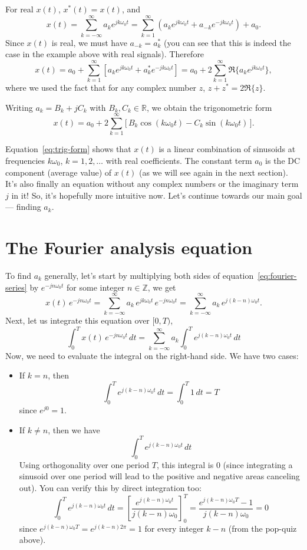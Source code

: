 For real $x(t)$, $x^\ast(t)=x(t)$, and
\[
x(t)=\sum_{k=-\infty}^{\infty} a_k e^{jk\omega_0 t}
=\sum_{k=1}^{\infty}\!\left( a_k e^{jk\omega_0 t}+a_{-k} e^{-jk\omega_0 t}\right)+a_0.
\]
Since $x(t)$ is real, we must have $a_{-k}=a_k^\ast$ (you can see that this is indeed the case in the example above with real signals). Therefore
\[
x(t)=a_0+\sum_{k=1}^{\infty}\!\left[a_k e^{jk\omega_0 t}+a_k^\ast e^{-jk\omega_0 t}\right]
= a_0+ 2\sum_{k=1}^{\infty} \Re\!\big\{a_k e^{jk\omega_0 t}\big\},
\]
where we used the fact that for any complex number $z$, $z+z^\ast=2\Re\{z\}$.

Writing $a_k=B_k+jC_k$ with $B_k,C_k\in\mathbb{R}$, we obtain the trigonometric form
\begin{equation}
\,x(t)=a_0+2\sum_{k=1}^{\infty}\!\big[\,B_k\cos(k\omega_0 t)-C_k\sin(k\omega_0 t)\,\big].\,
\label{eq:trig-form}
\end{equation}

Equation~\eqref{eq:trig-form} shows that $x(t)$ is a linear combination of sinusoids at frequencies $k\omega_0$, $k=1,2,\ldots$ with real coefficients. The constant term $a_0$ is the DC component (average value) of $x(t)$ (as we will see again in the next section). It's also finally an equation without any complex numbers or the imaginary term $j$ in it! So, it's hopefully more intuitive now. Let's continue towards our main goal --- finding $a_k$.


\section{The Fourier analysis equation}
\label{sec:w6l2-analysis}
To find $a_k$ generally, let's start by multiplying both sides of equation~\eqref{eq:fourier-series} by $e^{-jn\omega_0 t}$ for some integer $n \in \mathbb{Z}$, we get
\[
x(t)\,e^{-jn\omega_0 t}
=\sum_{k=-\infty}^{\infty} a_k\,e^{jk\omega_0 t}\,e^{-jn\omega_0 t}
=\sum_{k=-\infty}^{\infty} a_k\,e^{j(k-n)\omega_0 t}.
\]
Next, let us integrate this equation over $[0,T)$,
\[
\int_{0}^{T} x(t)\,e^{-jn\omega_0 t}\,dt
=\sum_{k=-\infty}^{\infty} a_k \int_{0}^{T} e^{j(k-n)\omega_0 t}\,dt
\]
Now, we need to evaluate the integral on the right-hand side. We have two cases:
\begin{itemize}
\item If $k=n$, then
\[ \int_{0}^{T} e^{j(k-n)\omega_0 t}\,dt=\int_{0}^{T} 1\,dt=T\] since $e^{j0}=1$.

\item If $k\neq n$, then we have
\[
\int_{0}^{T} e^{j(k-n)\omega_0 t}\,dt
\]
Using orthogonality over one period $T$, this integral is 0 (since integrating a sinusoid over one period will lead to the positive and negative areas canceling out). You can verify this by direct integration too:
\[
\int_{0}^{T} e^{j(k-n)\omega_0 t}\,dt
=\left[\frac{e^{j(k-n)\omega_0 t}}{j(k-n)\omega_0}\right]_{0}^{T}
=\frac{e^{j(k-n)\omega_0 T}-1}{j(k-n)\omega_0}=0
\]
since $e^{j(k-n)\omega_0 T}=e^{j(k-n)2\pi}=1$ for every integer $k-n$ (from the pop-quiz above).
\end{itemize}


